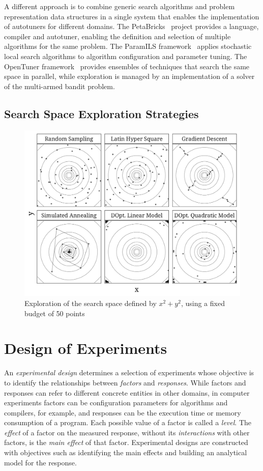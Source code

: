\documentclass[conference]{IEEEtran}
\begin{document}
A different approach is to combine generic search algorithms and problem
representation data structures in a single system that enables the
implementation of autotuners for different domains. The
PetaBricks~\cite{ansel2009petabricks} project provides a language,
compiler and autotuner, enabling the definition and selection of multiple
algorithms for the same problem. The ParamILS
framework~\cite{hutter2009paramils} applies stochastic local search
algorithms to algorithm configuration and parameter tuning. The OpenTuner
framework~\cite{ansel2014opentuner} provides ensembles of techniques that
search the same space in parallel, while exploration is managed by an
implementation of a solver of the multi-armed bandit problem.
\subsection{Search Space Exploration Strategies}
\label{sec:org4cc4caa}
\begin{center}
\begin{figure}[htbp]
\centering
\includegraphics[width=.95\columnwidth]{./img/sampling_comparison.pdf}
\caption{Exploration of the search space defined by \(x^2 + y^2\), using a fixed budget of 50 points}
\end{figure}
\end{center}
\section{Design of Experiments}
\label{sec:orgd1ba17e}
An \emph{experimental design} determines a selection of experiments whose objective
is to identify the relationships between \emph{factors} and \emph{responses}. While
factors and responses can refer to different concrete entities in other domains,
in computer experiments factors can be configuration parameters for algorithms
and compilers, for example, and responses can be the execution time or memory
consumption of a program. Each possible value of a factor is called a \emph{level}.
The \emph{effect} of a factor on the measured response, without its \emph{interactions}
with other factors, is the \emph{main effect} of that factor. Experimental designs
are constructed with objectives such as identifying the main effects and
building an analytical model for the response.
\end{document}

